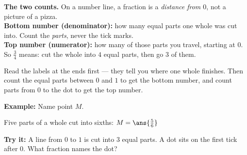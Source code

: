 \documentclass[12pt]{article}
\begin{document}

\begin{formulabox}
\textbf{The two counts.} On a number line, a fraction is a \emph{distance from
$0$}, not a picture of a pizza.\\[3pt]
\textbf{Bottom number (denominator):} how many equal parts one whole was cut
into. Count the \emph{parts}, never the tick marks.\\[2pt]
\textbf{Top number (numerator):} how many of those parts you travel, starting
at $0$.\\[3pt]
So $\frac{3}{4}$ means: cut the whole into $4$ equal parts, then go $3$ of them.
\end{formulabox}


\begin{formulabox}
Read the labels at the ends first --- they tell you where one whole finishes.
Then count the equal parts between $0$ and $1$ to get the bottom number, and
count parts from $0$ to the dot to get the top number.
\end{formulabox}

\begin{examplebox}
\textbf{Example:} Name point $M$.
\begin{center}
\end{center}
Five parts of a whole cut into sixths: $M = \ans{\tfrac{5}{6}}$
\end{examplebox}

\begin{tryitbox}
\textbf{Try it:} A line from $0$ to $1$ is cut into $3$ equal parts. A dot sits
on the first tick after $0$. What fraction names the dot?\\[2pt]
\end{tryitbox}
\end{document}
